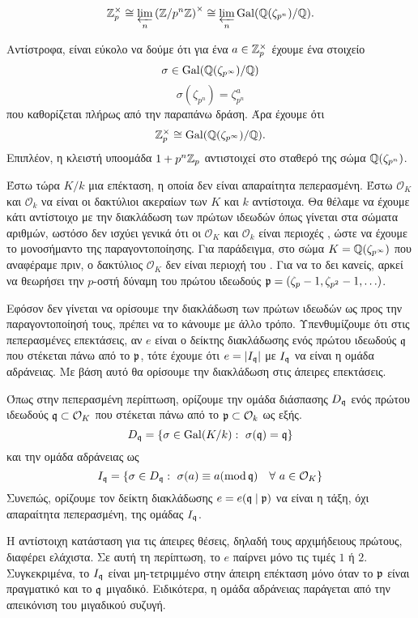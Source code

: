 $$\mathbb{Z}_p^\times \cong \varprojlim\limits_n \left(\mathbb{Z}/p^n\mathbb{Z}\right)^\times \cong \varprojlim\limits_n \operatorname{Gal}(\mathbb{Q}(\zeta_{p^n})/\mathbb{Q}).$$

\noindent Αντίστροφα, είναι εύκολο να δούμε ότι για ένα $a \in \mathbb{Z}_p^\times$ έχουμε ένα στοιχείο $$\sigma \in \operatorname{Gal}(\mathbb{Q}(\zeta_{p^\infty})/\mathbb{Q})$$
$$\sigma(\zeta_{p^n}) =\zeta^a_{p^n}$$ που καθορίζεται πλήρως από την παραπάνω δράση. Άρα έχουμε ότι
$$\mathbb{Z}^\times_p \cong \operatorname{Gal}(\mathbb{Q}(\zeta_{p^\infty})/\mathbb{Q}).$$ Επιπλέον, η κλειστή υποομάδα $1+p^n\mathbb{Z}_p$ αντιστοιχεί στο σταθερό της σώμα $\mathbb{Q}(\zeta_{p^n})$.


Έστω τώρα $K/k$ μια  επέκταση, η οποία δεν είναι απαραίτητα πεπερασμένη. Έστω $\mathcal{O}_K$ και $\mathcal{O}_k$ να είναι οι 
δακτύλιοι ακεραίων των $K$ και $k$ αντίστοιχα. Θα θέλαμε να έχουμε κάτι αντίστοιχο με την διακλάδωση των πρώτων ιδεωδών όπως γίνεται στα 
σώματα αριθμών, ωστόσο δεν ισχύει γενικά ότι οι $\mathcal{O}_K$ και $\mathcal{O}_k$ είναι περιοχές , ώστε να έχουμε το 
μονοσήμαντο της παραγοντοποίησης. Για παράδειγμα, στο σώμα $K = \mathbb{Q}(\zeta_{p^\infty})$ που αναφέραμε πριν, ο δακτύλιος $\mathcal{O}_K$ 
δεν είναι περιοχή του . Για να το δει κανείς, αρκεί να θεωρήσει την $p$-οστή δύναμη του πρώτου ιδεωδούς 
$\mathfrak{p} = (\zeta_p-1,\zeta_{p^2}-1,\ldots)$.

Εφόσον δεν γίνεται να ορίσουμε την διακλάδωση των πρώτων ιδεωδών ως προς την παραγοντοποίησή τους, πρέπει να το κάνουμε με άλλο τρόπο. 
Υπενθυμίζουμε ότι στις πεπερασμένες επεκτάσεις, αν $e$ είναι ο δείκτης διακλάδωσης ενός πρώτου ιδεωδούς $\mathfrak{q}$ που στέκεται πάνω από το $\mathfrak{p}$, τότε έχουμε ότι $e = |I_{\mathfrak{q}}|$ με $I_{\mathfrak{q}}$ να είναι η ομάδα αδράνειας. Με βάση αυτό θα ορίσουμε την διακλάδωση στις άπειρες επεκτάσεις.

Όπως στην πεπερασμένη περίπτωση, ορίζουμε την ομάδα διάσπασης $D_{\mathfrak{q}}$ ενός πρώτου ιδεωδούς $\mathfrak{q} \subset \mathcal{O}_K$ 
που στέκεται πάνω από το $\mathfrak{p} \subset \mathcal{O}_k$ ως εξής.
$$D_\q = \{ \sigma \in \Gal (K/k): \ \sigma(\q) = \q \}$$ και την ομάδα αδράνειας ως 
$$I_{\mathfrak{q}} = \{ \sigma \in D_{\mathfrak{q}}: \ \sigma(a) \equiv a(\operatorname{mod}\mathfrak{q}) \quad \forall \ a \in \mathcal{O}_K\}$$ Συνεπώς, ορίζουμε τον 
δείκτη διακλάδωσης $e = e(\mathfrak{q} \mid \mathfrak{p})$ να είναι η τάξη, όχι απαραίτητα πεπερασμένη, της ομάδας $I_{\mathfrak{q}}$.

Η αντίστοιχη κατάσταση για τις άπειρες θέσεις, δηλαδή τους αρχιμήδειους πρώτους, διαφέρει ελάχιστα. Σε αυτή τη περίπτωση, το $e$ παίρνει 
μόνο τις τιμές $1$ ή $2$. Συγκεκριμένα, το $I_{\mathfrak{q}}$ είναι μη-τετριμμένο στην άπειρη επέκταση μόνο όταν το $\mathfrak{p}$ είναι πραγματικό και το $\mathfrak{q}$ 
μιγαδικό. Ειδικότερα, η ομάδα αδράνειας παράγεται από την απεικόνιση του μιγαδικού συζυγή.
